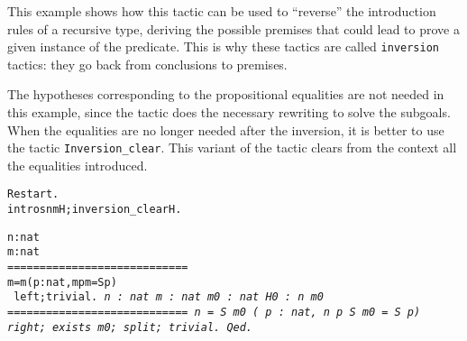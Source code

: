 \documentclass[11pt]{article}
\begin{document}
This example shows how this tactic can be used to ``reverse'' the
introduction rules of a recursive type, deriving the possible premises
that could lead to prove a given instance of the predicate. This is
why these tactics are called \texttt{inversion} tactics: they go back
from conclusions to premises.

The hypotheses corresponding to the propositional equalities are not
needed in this example, since the tactic does the necessary rewriting
to solve the subgoals.  When the equalities are no longer needed after
the inversion, it is better to use the tactic
\texttt{Inversion\_clear}. This variant of the tactic clears from the
context all the equalities introduced.

\begin{alltt}
Restart.
 intros n m H; inversion_clear H.
\it
\it
  
  n : nat
  m : nat
  ============================
   m = m {\coqor} ({\exsym} p : nat, m {\coqle} p {\coqand} m = S p)
\tt
 left;trivial.
\it
  n : nat
  m : nat
  m0 : nat
  H0 : n {\coqle} m0
  ============================
   n = S m0 {\coqor} ({\exsym} p : nat, n {\coqle} p {\coqand} S m0 = S p)
\tt
 right; exists m0; split; trivial.
Qed.
\end{alltt}


\end{document}
